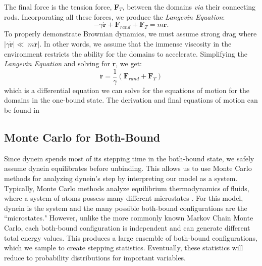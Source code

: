 The final force is the tension force, \textbf{F}$_T$, between the domains \textit{via} their connecting rods. Incorporating all these forces, we produce the \textit{Langevin Equation}:
\begin{equation}
	-\gamma \dot{\textbf{r}} + \textbf{F}_{rand} + \textbf{F}_T = m\ddot{\textbf{r}}.
\end{equation}
To properly demonstrate Brownian dynamics, we must assume strong drag where $|\gamma \dot{\textbf{r}}|\ll |m\ddot{\textbf{r}}|$. In other words, we assume that the immense viscosity in the environment restricts the ability for the domains to accelerate. Simplifying the \textit{Langevin Equation} and solving for $\dot{\textbf{r}}$, we get:
\begin{equation}
	\dot{\textbf{r}}=\frac{1}{\gamma}(\textbf{F}_{rand} + \textbf{F}_T)
\end{equation}
which is a differential equation we can solve for the equations of motion for the domains in the one-bound state. The derivation and final equations of motion can be found in \cite{Capek2017}


\subsection{Monte Carlo for Both-Bound}
Since dynein spends most of its stepping time in the both-bound state, we safely assume dynein equilibrates before unbinding. This allows us to use Monte Carlo methods for analyzing dynein's step by interpreting our model as a system. Typically, Monte Carlo methods analyze equilibrium thermodynamics of fluids, where a system of atoms possess many different microstates \cite{lim2007vorticity}. For this model, dynein is the system and the many possible both-bound configurations are the ``microstates." However, unlike the more commonly known Markov Chain Monte Carlo, each both-bound configuration is independent and can generate different total energy values. This produces a large ensemble of both-bound configurations, which we sample to create stepping statistics. Eventually, these statistics will reduce to probability distributions for important variables.

